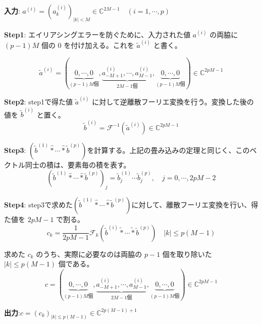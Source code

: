 \textbf{入力}: $a^{(i)} = (a^{(i)}_k)_{|k|<M}\in\mathbb{C}^{2M-1} \quad (i = 1, \cdots , p)$

\textbf{Step1}: エイリアシングエラーを防ぐために、入力された値 $a^{(i)}$ の両脇に $(p-1)M$ 個の $0$ を付け加える。これを $\tilde{a}^{(i)}$ と書く。

\footnotesize
$$
    \tilde{a}^{(i)} = (\underbrace{0, \cdots , 0}_{(p-1)M\text{個}}, \underbrace{a^{(i)}_{-M+1}, \cdots , a^{(i)}_{M-1}}_{2M-1\text{個}},\underbrace{0, \cdots , 0}_{(p-1)M\text{個}}) \in \mathbb{C}^{2pM-1}
$$
\normalsize

\textbf{Step2}: step1で得た値 $\tilde{a}^{(i)}$ に対して逆離散フーリエ変換を行う。変換した後の値を $\tilde{b}^{(i)}$ と置く。
$$
    \tilde{b}^{(i)} = \mathcal{F}^{-1}(\tilde{a}^{(i)}) \in \mathbb{C}^{2pM-1}
$$

\textbf{Step3}: $ (\tilde{b}^{(1)} \hat{*} \cdots \hat{*} \tilde{b}^{(p)}) $を計算する。上記の畳み込みの定理と同じく、このベクトル同士の積は、要素毎の積を表す。
$$
    (\tilde{b}^{(1)} \hat{*} \cdots \hat{*} \tilde{b}^{(p)} )_{j} = \tilde{b}^{(1)}_j \cdots \tilde{b}^{(p)}_j , \quad j = 0, \cdots , 2pM-2
$$

\textbf{Step4}: step3で求めた$ (\tilde{b}^{(1)} \hat{*} \cdots \hat{*} \tilde{b}^{(p)}) $に対して、離散フーリエ変換を行い、得た値を $2pM-1$ で割る。
$$
     c_k = \frac{1}{2pM-1} \mathcal{F}_k (\tilde{b}^{(i)} \tilde{*} \cdots \tilde{*} \tilde{b}^{(p)}) \quad |k| \leq p(M-1)
$$

求めた $c_k$ のうち、実際に必要なのは両脇の $p-1$ 個を取り除いた $|k| \leq p(M-1)$ 個である。
\footnotesize
$$
    c = (\underbrace{0, \cdots , 0}_{(p-1)M\text{個}}, \underbrace{a^{(i)}_{-M+1}, \cdots , a^{(i)}_{M-1}}_{2M-1\text{個}},\underbrace{0, \cdots , 0}_{(p-1)M\text{個}}) \in \mathbb{C}^{2pM-1}
$$
\normalsize


\textbf{出力}:$c = (c_k)_{|k|\le p(M-1)}\in\mathbb{C}^{2p(M-1)+1}$

